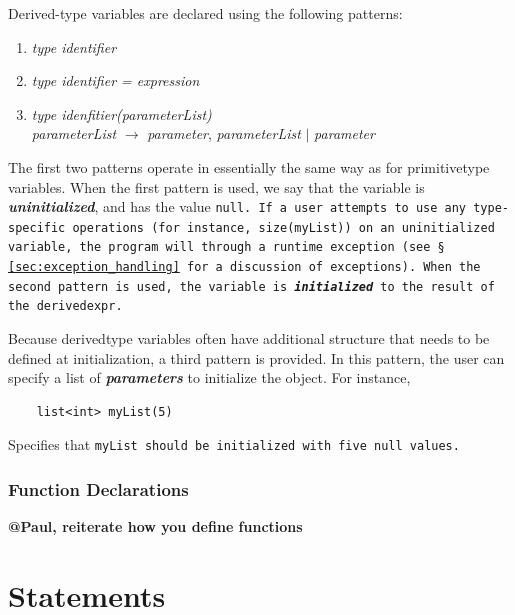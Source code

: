 \documentclass{article}
\begin{document}
Derived-type variables are declared using the following patterns:

\begin{enumerate}
  \item \emph{type identifier}
  \item \emph{type identifier = expression }
  \item \emph{type idenfitier(parameterList)} \\
  \indent \emph{parameterList} $\rightarrow$ \emph{parameter}, \emph{parameterList} $|$ \emph{parameter}
\end{enumerate}

The first two patterns operate in essentially the same way as for primitive­type
variables. When the first pattern is used, we say that the variable is
\textbf{\emph{uninitialized}}, and has the value \tt null\rm. If a user attempts to
use any type­specific operations (for instance, \tt size(myList)) \rm on an
uninitialized variable, the program will through a run­time exception (see \S
\ref{sec:exception_handling} for a discussion of exceptions). When the second
pattern is used, the variable is \textbf{\emph{initialized}} to the result of the
\tt derived­expr\rm.

Because derived­type variables often have additional structure that needs to be
defined at initialization, a third pattern is provided. In this pattern, the user
can specify a list of \textbf{\emph{parameters}} to initialize the object. For
instance,

\begin{verbatim}
    list<int> myList(5)
\end{verbatim}

Specifies that \tt myList \rm should be initialized with five \tt null \rm values.


\subsubsection{Function Declarations} %
\label{ssub:function_declarations}

\textbf{@Paul, reiterate how you define functions}




\section{Statements} %
\label{sec:statements}
\end{document}
